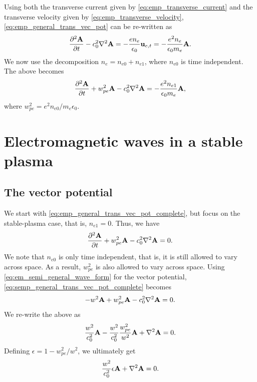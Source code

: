 \documentclass[a4paper,11pt]{report}
\begin{document}
Using both the transverse current given by \cref{eq:emp_transverse_current} and the transverse velocity given by \cref{eq:emp_transverse_velocity}, \cref{eq:emp_general_trans_vec_pot} can be re-written as
\begin{equation*}
    \frac{\partial^2 \mathbf{A}}{\partial t} - c_0^2 \nabla^2 \mathbf{A} = -\frac{e n_e}{\epsilon_0} \mathbf{u}_{e,t} = -\frac{e^2 n_e}{\epsilon_0 m_e} \mathbf{A}.
\end{equation*}
We now use the decomposition $n_e = n_{e0} + n_{e1}$, where $n_{e0}$ is time independent. The above becomes
\begin{equation}
    \label{eq:emp_general_trans_vec_pot_complete}
    \frac{\partial^2 \mathbf{A}}{\partial t} + w_{pe}^2 \mathbf{A} - c_0^2 \nabla^2 \mathbf{A} = -\frac{e^2 n_{e1}}{\epsilon_0 m_e} \mathbf{A},
\end{equation}
where $w_{pe}^2 = e^2 n_{e0} / m_e \epsilon_0$.

\chapter{Electromagnetic waves in a stable plasma}

\section{The vector potential}
\label{sec:semp_vector_potential}
We start with \cref{eq:emp_general_trans_vec_pot_complete}, but focus on the stable-plasma case, that is, $n_{e1} = 0$. Thus, we have
\begin{equation}
    \label{eq:semp_general_trans_vec_pot_complete}
    \frac{\partial^2 \mathbf{A}}{\partial t} + w_{pe}^2 \mathbf{A} - c_0^2 \nabla^2 \mathbf{A} = 0.
\end{equation}
We note that $n_{e0}$ is only time independent, that is, it is still allowed to vary across space. As a result, $w_{pe}^2$ is also allowed to vary across space. Using \cref{eq:em_semi_general_wave_form} for the vector potential, \cref{eq:semp_general_trans_vec_pot_complete} becomes
\begin{equation*}
    -w^2 \mathbf{A} + w_{pe}^2 \mathbf{A} - c_0^2 \nabla^2 \mathbf{A} = 0.
\end{equation*}
We re-write the above as
\begin{equation*}
    \frac{w^2}{c_0^2} \mathbf{A} - \frac{w^2}{c_0^2} \frac{w_{pe}^2}{w^2} \mathbf{A} + \nabla^2 \mathbf{A} = 0.
\end{equation*}
Defining $\epsilon = 1 - w_{pe}^2 / w^2$, we ultimately get
\begin{equation}
    \label{eq:semp_general_trans_vec_pot_complete_spec}
    \frac{w^2}{c_0^2} \epsilon \mathbf{A} + \nabla^2 \mathbf{A} = 0.
\end{equation}
\end{document}
